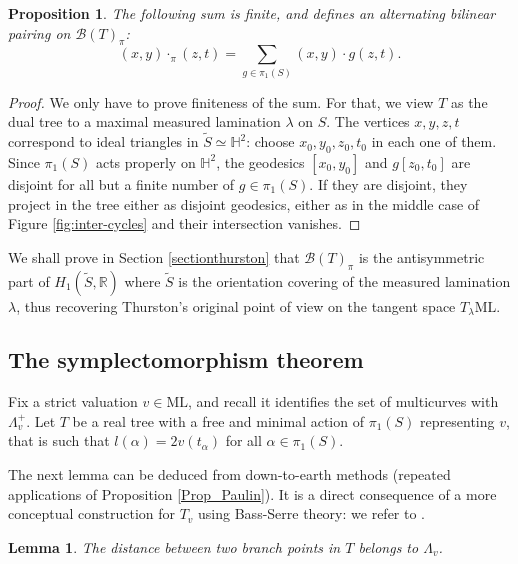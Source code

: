\documentclass{amsart}
\newtheorem{lemma}{Lemma}
\newtheorem{proposition}{Proposition}
\newcommand{\R}{\mathbb{R}}
\newcommand{\ML}{\mathrm{ML}}
\newcommand{\Bb}{\mathcal{B}}
\renewcommand{\H}{\mathbb{H}}
\begin{document}
\begin{proposition}
The following sum is finite, and defines an alternating bilinear pairing on $\Bb(T)_\pi$: 
$$(x,y)\cdot_\pi (z,t)=\sum_{g\in \pi_1(S)} (x,y)\cdot g(z,t).$$
\end{proposition}
\begin{proof}
We only have to prove finiteness of the sum. For that, we view $T$ as the dual tree to a maximal measured lamination $\lambda$ on $S$. The vertices $x,y,z,t$ correspond to ideal triangles in $\tilde{S}\simeq \H^2$: choose $x_0,y_0,z_0,t_0$ in each one of them. Since $\pi_1(S)$ acts properly on $\H^2$, the geodesics $[x_0,y_0]$ and $g[z_0,t_0]$ are disjoint for all but a finite number of $g\in \pi_1(S)$. If they are disjoint, they project in the tree either as disjoint geodesics, either as in the middle case of Figure \ref{fig:inter-cycles} and their intersection vanishes.
\end{proof}

%
We shall prove in Section \ref{sectionthurston} that $\Bb(T)_\pi$ is the antisymmetric part of $H_1(\tilde{S},\R)$ where $\tilde{S}$ is the orientation covering of the measured lamination $\lambda$, thus recovering Thurston's original point of view on the tangent space $T_\lambda \ML$. 

\subsection{The symplectomorphism theorem}

Fix a strict valuation $v\in \ML$, and recall it identifies the set of multicurves with $\Lambda^+_v$. Let $T$ be a real tree with a free and minimal action of $\pi_1(S)$ representing $v$, that is such that $l(\alpha)=2 v(t_\alpha)$ for all $\alpha\in \pi_1(S)$. 

The next lemma can be deduced from down-to-earth methods (repeated applications of Proposition \ref{Prop_Paulin}). 
%
It is a direct consequence of a more conceptual construction for $T_v$ using Bass-Serre theory: we refer to \cite[Section 4]{Otal_compact-repres_2015}.

\begin{lemma}
The distance between two branch points in $T$ belongs to $\Lambda_v$.
\end{lemma}
\end{document}
